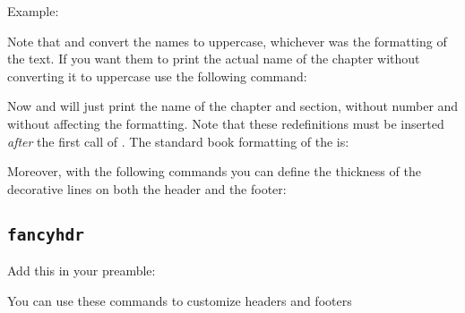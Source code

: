 Example:
\begin{examplefr}
\renewcommand{\chaptermark}[1]{ \markboth{#1}{} }
\renewcommand{\sectionmark}[1]{ \markright{#1}{} }
\pagestyle{fancy}
\end{examplefr}

Note that \code{\leftmark} and \code{\rightmark} convert the names to uppercase, whichever was the formatting of the text. If you want them to print the actual name of the chapter without converting it to uppercase use the following command: 

\begin{latex}
\renewcommand{\chaptermark}[1]{ \markboth{#1}{} }
\renewcommand{\sectionmark}[1]{ \markright{#1}{} }
\end{latex}

Now \code{\leftmark} and \code{\rightmark} will just print the name of the chapter and section, without number and without affecting the formatting.
Note that these redefinitions must be inserted \emph{after} the first call of \code{\pagestyle{fancy}}. The standard book formatting of the \code{\chaptermark} is:
\begin{latex}
\renewcommand{\chaptermark}[1]{\markboth{
    \MakeUppercase{\chaptername\ \thechapter.\ #1}}{}}
\end{latex}
Moreover, with the following commands you can define the thickness of the decorative lines on both the header and the footer:
\begin{latex}
\renewcommand{\headrulewidth}{0.5pt}
\renewcommand{\footrulewidth}{0pt}
\end{latex}

\subsection{\texttt{fancyhdr}}
Add this in your preamble:
\begin{latex}
\usepackage{fancyhdr}
\setlength{\headheight}{15.2pt}
\pagestyle{fancy}
\end{latex}

You can use these commands to customize headers and footers
\begin{latex}

\end{latex}

